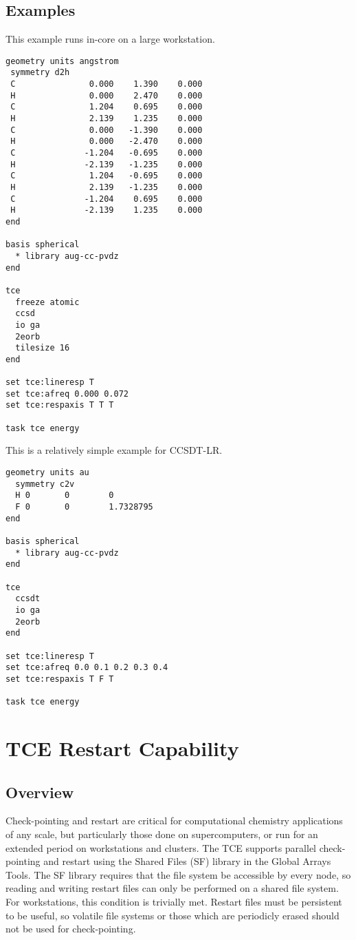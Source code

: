 \subsection{Examples}

This example runs in-core on a large workstation.

\begin{verbatim}
geometry units angstrom
 symmetry d2h
 C               0.000    1.390    0.000
 H               0.000    2.470    0.000
 C               1.204    0.695    0.000
 H               2.139    1.235    0.000
 C               0.000   -1.390    0.000
 H               0.000   -2.470    0.000
 C              -1.204   -0.695    0.000
 H              -2.139   -1.235    0.000
 C               1.204   -0.695    0.000
 H               2.139   -1.235    0.000
 C              -1.204    0.695    0.000
 H              -2.139    1.235    0.000
end

basis spherical
  * library aug-cc-pvdz
end

tce
  freeze atomic
  ccsd
  io ga
  2eorb
  tilesize 16
end

set tce:lineresp T
set tce:afreq 0.000 0.072
set tce:respaxis T T T

task tce energy
\end{verbatim}

This is a relatively simple example for CCSDT-LR.

\begin{verbatim}
geometry units au
  symmetry c2v
  H 0       0        0
  F 0       0        1.7328795
end

basis spherical
  * library aug-cc-pvdz
end

tce
  ccsdt
  io ga
  2eorb
end

set tce:lineresp T
set tce:afreq 0.0 0.1 0.2 0.3 0.4
set tce:respaxis T F T

task tce energy
\end{verbatim}

\section{TCE Restart Capability}

\subsection{Overview}

Check-pointing and restart are critical for computational chemistry applications of any scale, but particularly those done on supercomputers, or run for an extended period on workstations and clusters.  The TCE supports parallel check-pointing and restart using the Shared Files (SF) library in the Global Arrays Tools.  The SF library requires that the file system be accessible by every node, so reading and writing restart files can only be performed on a shared file system.  For workstations, this condition is trivially met.  Restart files must be persistent to be useful, so volatile file systems or those which are periodicly erased should not be used for check-pointing.

